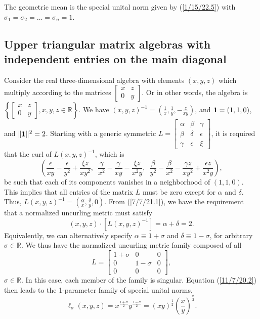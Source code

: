 \documentclass{amsart}
\theoremstyle{definition}
\numberwithin{theorem}{section}
\numberwithin{equation}{section}
\begin{document}
 The geometric mean is the special unital norm given by (\ref{1/15/22.5}) with $\sigma_1=\sigma_2=\dots =\sigma_n = 1$.  
   
 \subsection{Upper triangular matrix algebras with independent entries on the main diagonal} Consider the real three-dimensional algebra with elements $(x,y,z)$ which multiply according to the matrices 
$\left[
\begin{array}{ccc}
 x & z   \\
 0 & y    
\end{array}
\right]$.  Or in other words, the algebra is $\left\{ \left[
\begin{array}{ccc}
 x & z   \\
 0 & y    
\end{array}
\right],x,y,z\in\mathbb{R}\right\}$.  We have $(x,y,z)^{-1} = \left( \frac{1}{x}, \frac{1}{y}, -\frac{z}{xy} \right)$, and ${\bf 1}= (1,1,0)$, and $\|{\bf 1}\|^2 = 2$.  Starting with a generic symmetric $L = \left[
\begin{array}{ccc}
 \alpha & \beta & \gamma   \\
 \beta & \delta & \epsilon \\ \gamma & \epsilon & \xi    
\end{array}
\right]$, 
it is required that the curl of $L(x,y,z)^{-1}$, which is \[\left( \frac{\epsilon}{xy} - \frac{\epsilon}{y^2} + \frac{\xi z}{xy^2},\,\,\, \frac{\gamma}{x^2} - \frac{\gamma}{xy} - \frac{\xi z}{x^2y}, \,\,\, \frac{\beta}{y^2} - \frac{\beta}{x^2} - \frac{\gamma z}{xy^2} + \frac{\epsilon z}{x^2y} \right),\] be such that each of its components vanishes in a neighborhood of $(1,1,0)$.  This implies that all entries of the matrix $L$ must be zero except for $\alpha$ and $\delta$.   Thus, $L(x,y,z)^{-1} = (\frac{\alpha}{x}, \frac{\delta}{y},0)$.  From (\ref{7/7/21.1}), we have the requirement that a normalized uncurling metric must satisfy \[ (x,y,z)\cdot [L(x,y,z)^{-1}] = \alpha +\delta =  2.\]  Equivalently, we can alternatively specify $\alpha \equiv 1+\sigma$ and $\delta \equiv 1-\sigma$, for arbitrary $\sigma\in\mathbb{R}$.   We thus have the normalized uncurling metric family composed of all  \begin{equation}\label{11/17/22.2} L = \left[
\begin{array}{ccc}
 1+\sigma & 0 & 0   \\
 0 & 1-\sigma & 0 \\ 0 & 0 & 0    
\end{array}
\right],\end{equation} $\sigma\in\mathbb{R}$.  In this case, each member of the family is singular.  Equation (\ref{11/7/20.2}) then leads to the 1-parameter family of special unital norms, \begin{equation}\label{12/21/21.1} \ell_\sigma(x,y,z) = x^\frac{1+\sigma}{2} y^\frac{1-\sigma}{2} = (xy)^{\frac{1}{2}}\left(\frac{x}{y}\right)^{\frac{\sigma}{2}}.\end{equation} 
\end{document}
